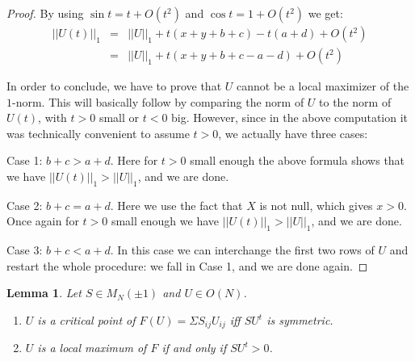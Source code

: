 \documentclass[12pt]{amsart}
\newtheorem{lemma}[theorem]{Lemma}
\begin{document}
\begin{proof}
By using $\sin t=t+O(t^2)$ and $\cos t=1+O(t^2)$ we get:
\begin{eqnarray*}
||U(t)||_1
&=&||U||_1+t(x+y+b+c)-t(a+d)+O(t^2)\\
&=&||U||_1+t(x+y+b+c-a-d)+O(t^2)
\end{eqnarray*}

In order to conclude, we have to prove that $U$ cannot be a local maximizer of the $1$-norm. This will basically follow by comparing the norm of $U$ to the norm of $U(t)$, with $t>0$ small or $t<0$ big. However, since in the above computation it was technically convenient to assume $t>0$, we actually have three cases:

Case 1: $b+c>a+d$. Here for $t>0$ small enough the above formula shows that we have $||U(t)||_1>||U||_1$, and we are done.

Case 2: $b+c=a+d$. Here we use the fact that $X$ is not null, which gives $x>0$. Once again for $t>0$ small enough we have $||U(t)||_1>||U||_1$, and we are done.

Case 3: $b+c<a+d$. In this case we can interchange the first two rows of $U$ and restart the whole procedure: we fall in Case 1, and we are done again.
\end{proof}

\begin{lemma}
Let $S\in M_N(\pm 1)$ and $U\in O(N)$.
\begin{enumerate}
\item $U$ is a critical point of $F(U)=\Sigma S_{ij}U_{ij}$ iff $SU^t$ is symmetric.

\item $U$ is a local maximum of $F$ if and only if $SU^t>0$.
\end{enumerate}
\end{lemma}
\end{document}
